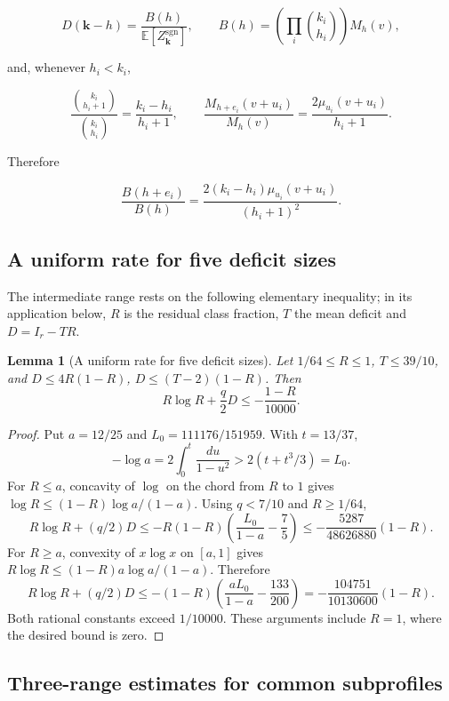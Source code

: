 \documentclass[a4paper,10pt,reqno]{amsart}
\numberwithin{equation}{section}
\newcommand{\Exp}[1]{\mathbb{E}\!\left[#1\right]}
\theoremstyle{plain}
\newtheorem{lemma}[theorem]{Lemma}
\theoremstyle{remark}
\begin{document}
\begin{equation}
 D(\mathbf k-h)=\frac{B(h)}{\Exp{Z_{\mathbf k}^{\mathrm{sgn}}}},\qquad
 B(h)=\left(\prod_i\binom{k_i}{h_i}\right)M_h(v), \label{eq:common-complementary-identity}
\end{equation}

and, whenever \(h_i<k_i\),

\[
 \frac{\binom{k_i}{h_i+1}}{\binom{k_i}{h_i}}
 =\frac{k_i-h_i}{h_i+1},\qquad
 \frac{M_{h+e_i}(v+u_i)}
      {M_h(v)}
 =\frac{2\mu_{u_i}(v+u_i)}{h_i+1}.
\]

Therefore

\begin{equation}
\frac{B(h+e_i)}{B(h)}
 =\frac{2(k_i-h_i)\mu_{u_i}(v+u_i)}{(h_i+1)^2}.          \label{eq:common-reverse-recurrence}
\end{equation}

\subsection{A uniform rate for five deficit sizes}
\label{app:five-size-rate}

The intermediate range rests on the following elementary inequality; in its
application below, $R$ is the residual class fraction, $T$ the mean deficit
and $D=I_r-TR$.


\begin{lemma}[A uniform rate for five deficit sizes]\label{lem:five-size-rate}
Let $1/64\le R\le1$, $T\le39/10$, and
$D\le4R(1-R)$, $D\le(T-2)(1-R)$. Then
\[
 R\log R+\frac{q}{2}D\le-\frac{1-R}{10000}.
\]
\end{lemma}
\begin{proof}
Put $a=12/25$ and $L_0=111176/151959$. With $t=13/37$,
\[
 -\log a=2\int_0^t\frac{du}{1-u^2}
 >2(t+t^3/3)=L_0.
\]
For $R\le a$, concavity of $\log$ on the chord from $R$ to $1$ gives
$\log R\le(1-R)\log a/(1-a)$. Using $q<7/10$ and $R\ge1/64$,
\[
 R\log R+(q/2)D
 \le-R(1-R)\left(\frac{L_0}{1-a}-\frac75\right)
 \le-\frac{5287}{48626880}(1-R).
\]
For $R\ge a$, convexity of $x\log x$ on $[a,1]$ gives
$R\log R\le(1-R)a\log a/(1-a)$. Therefore
\[
 R\log R+(q/2)D
 \le-(1-R)\left(\frac{aL_0}{1-a}-\frac{133}{200}\right)
 =-\frac{104751}{10130600}(1-R).
\]
Both rational constants exceed $1/10000$. These arguments include $R=1$,
where the desired bound is zero.
\end{proof}

\subsection{Three-range estimates for common subprofiles}
\label{app:common-subprofile-details}
\end{document}
